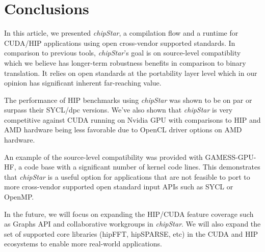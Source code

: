 \documentclass[Afour,sageh,times]{sagej}
\newcommand{\chipstar}{\textit{chipStar}\xspace}
\begin{document}

\section{Conclusions}
\label{section:conclusions}

In this article, we presented \chipstar, a compilation flow and a runtime for CUDA/HIP applications using open cross-vendor supported standards. In comparison to previous tools, \chipstar's goal is on source-level compatiblity which we believe has longer-term robustness benefits in comparison to binary translation. 
It relies on open standards at the portability layer level which in our opinion has significant inherent far-reaching value.

The performance of HIP benchmarks using \chipstar was shown to be on par or surpass their SYCL/\gls{dpc} versions. We've also shown that \chipstar is very competitive against CUDA running on Nvidia GPU with comparisons to HIP and AMD hardware being less favorable due to OpenCL driver options on AMD hardware.

An example of the source-level compatibility was provided with GAMESS-GPU-HF, a code base with a significant number of kernel code lines. This demonstrates that \chipstar is a useful option for applications that are not feasible to port to more cross-vendor supported open standard input APIs such as SYCL or OpenMP.

In the future, we will focus on expanding the HIP/CUDA feature coverage such as Graphs API and collaborative workgroups in \chipstar. We will also expand the set of supported core libraries (hipFFT, hipSPARSE, etc) in the CUDA and HIP ecosystems to enable more real-world applications.


\end{document}

